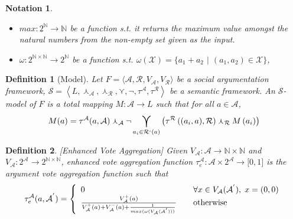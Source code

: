 \documentclass{article}
\newtheorem{definition}{Definition}
\newtheorem{notation}{Notation}
\newcommand{\nat}{\mathbb{N}}   %
\newcommand{\args}{\mathcal{A}} %
\newcommand{\att}{\mathcal{R}}  %
\newcommand{\valueset}{L}
\newcommand{\varg}{V_{\args}}   %
\newcommand{\vargpro}[1]{\varg^+\left(#1\right)} %
\newcommand{\vargcon}[1]{\varg^-\left(#1\right)} %
\newcommand{\vatt}{V_{\att}}   %
\newcommand{\attackers}[1]{\att^\text{-}\left(#1\right)}
\newcommand{\safid}{F}               %
\newcommand{\saf}{\safid = \safbody} %
\newcommand{\safbody}{\langle \args, \att, \varg, \vatt \rangle} %
\newcommand{\semid}{\mathcal{S}}        %
\newcommand{\sembodyNew}{\left\langle \valueset,\SAFand_\mathcal{A}, \SAFand_\mathcal{R}, \SAFor, \lnot, \tau^{\args}, \tau^{\att}\right\rangle} %
\newcommand{\SAFand}{\curlywedge}     %
\newcommand{\SAFor}{\curlyvee}        %
\DeclareMathOperator*{\SAFOr}{\bigcurlyvee} %
\newcommand{\sem}{\mathcal{S}}
\begin{document}
\begin{notation}
\begin{itemize}
\item $max: 2^{\nat} \to \nat$ be a function s.t. it returns the maximum value amongst the natural numbers from the non-empty set given as the input.

\item $\omega:  2^{\nat \times \nat} \to 2^{\nat}$ be a function s.t. $\omega(\mathcal{X}) = \{a_{1}+a_{2}$ $|$ $(a_{1}, a_{2}) \in \mathcal{X}\}$,

\end{itemize}
\end{notation}

\begin{definition}[Model] 
\label{def:model}
  Let $\saf$ be a social argumentation framework, $\sem = \sembodyNew$ be a semantic framework. An $\semid$-model of $\safid$ is a total mapping $M : \args \rightarrow \valueset$ such that for all $a \in \args$,
  $$\displaystyle M(a) = \tau^\args(a, \args ) \SAFand_\args \lnot \SAFOr_{a_i \in \attackers{a}} \left(\tau^\att\left((a_i, a), \att \right) \SAFand_\att M\left(a_i\right)\right)$$
\end{definition}


\begin{definition}
\label{def:enhVoteAgg}
[Enhanced Vote Aggregation]
 Given $\varg : \args \to \nat \times \nat$ and $\varg: 2^\args \to 2^{\nat \times \nat}$, enhanced vote aggregation function
$\tau^\args_{e}: \args \times {2}^{\args} \rightarrow\lbrack0,1]$ is the argument vote aggregation function such that
\[
\tau^\args_{e}  (a, \mathcal{A}^{'})  = \left\{
\begin{array}
[c]{lll}
0 &  & \forall x \in \varg (\mathcal{A}^{'}),\hspace{1mm} x = (0,0)\\
\frac{\vargpro a}{\vargpro a + \vargcon a+\frac{1}{max(\omega(\varg (\mathcal{A}^{'})))}} &  & \text{otherwise}%
\end{array}
\right.
\]
\end{definition}


\newpage
\end{document}
